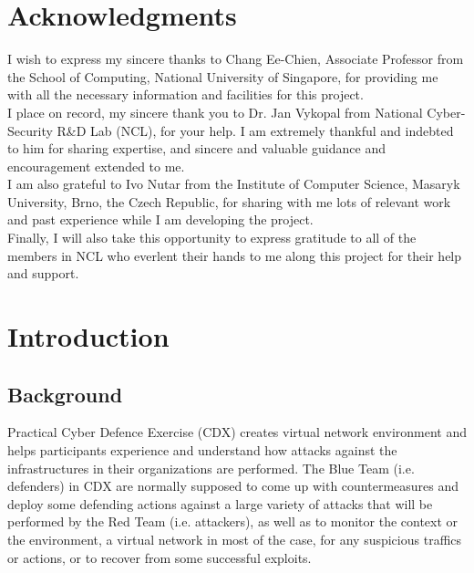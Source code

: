 \documentclass[12pt]{report}
\begin{document}
\chapter*{Acknowledgments}
\thispagestyle{empty}
\begin{spacing}{2}
\setlength{\parindent}{0pt} I wish to express my sincere thanks to Chang Ee-Chien, Associate Professor from the School of
Computing, National University of Singapore, for providing me with all the necessary information and facilities for this project.\\

\setlength{\parindent}{0pt} I place on record, my sincere thank you to Dr. Jan Vykopal from National Cyber-Security R\&D Lab (NCL), for your help. I am extremely thankful and indebted to him for sharing expertise, and sincere and valuable guidance and encouragement extended to me.\\

\setlength{\parindent}{0pt} I am also grateful to Ivo Nutar from the Institute of Computer Science, Masaryk University, Brno, the Czech Republic, for sharing with me lots of relevant work and past experience while I am developing the project.\\

\setlength{\parindent}{0pt} Finally, I will also take this opportunity to express gratitude to all of the members in NCL who everlent their hands to me along this project for their help and support.\\
\end{spacing}
\clearpage

\tableofcontents

\chapter{Introduction}
\section{Background}
Practical Cyber Defence Exercise (CDX) creates virtual network environment and helps participants experience and understand how attacks against the infrastructures in their organizations are performed. The Blue Team (i.e. defenders) in CDX are normally supposed to come up with countermeasures and deploy some defending actions against a large variety of attacks that will be performed by the Red Team (i.e. attackers), as well as to monitor the context or the environment, a virtual network in most of the case, for any suspicious traffics or actions, or to recover from some successful exploits.\\
\end{document}
